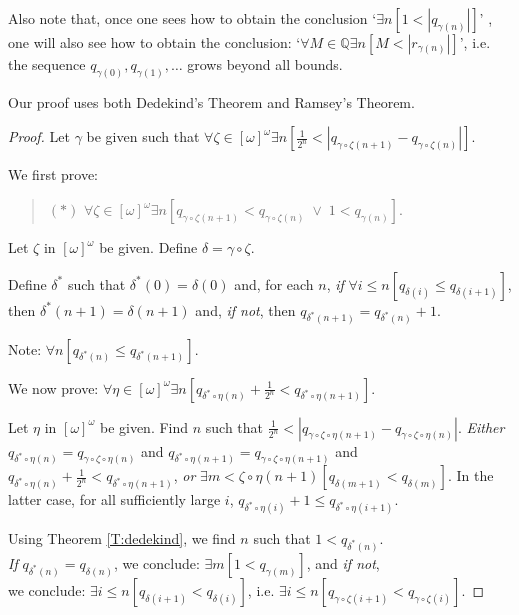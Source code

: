 \documentclass[a4paper]{amsart}
\theoremstyle{plain}
\begin{document}
	Also note that, once one sees how to obtain the conclusion `$\exists n[ 1 <|q_{ \gamma(n)}|]$' , one will also see how to obtain the conclusion:  `$\forall M\in \mathbb{Q}\exists n[ M<|r_{\gamma(n)}|]$', i.e. the sequence $q_{\gamma(0)}, q_{\gamma(1)}, \ldots$  grows beyond all bounds.
	
	Our proof uses both Dedekind's Theorem and Ramsey's Theorem. 
	\begin{proof}Let $\gamma$ be given such that $\forall \zeta \in [\omega]^\omega\exists n [ \frac{1}{2^n}<|q_{\gamma\circ\zeta(n+1)} -q_{\gamma\circ\zeta(n)}|]$.
	
	
	\smallskip
	
	
	We first prove:\begin{quote} $(\ast)$ $\forall \zeta \in [\omega]^\omega\exists n[q_{\gamma\circ\zeta(n+1)}< q_{\gamma\circ\zeta(n)} \;\vee \;  1<q_{\gamma(n)}]$. \end{quote}
	
	Let $\zeta$ in $[\omega]^\omega$ be given.  Define $\delta=\gamma\circ\zeta$.
	
	Define $\delta^\ast$ such that $\delta^\ast(0)=\delta(0)$ and, for each $n$, {\it if} $\forall i \le n[q_{\delta(i)}\le q_{ \delta(i+1)}]$, then $\delta^\ast(n+1)=\delta(n+1)$ and, {\it if not}, then $q_{\delta^\ast(n+1)}= q_{\delta^\ast(n)}+1$.
	
	Note: $\forall n[q_{\delta^\ast(n)}\le q_{\delta^\ast(n+1)}]$.
	
	We now prove: $\forall \eta \in [\omega]^\omega \exists n[q_{\delta^\ast\circ\eta(n)}+\frac{1}{2^n} < q_{\delta^\ast\circ \eta(n+1)}]$. 
	
	Let $\eta$ in $[\omega]^\omega$ be given. Find $n$ such that $\frac{1}{2^n}<|q_{\gamma\circ\zeta\circ\eta(n+1)}-q_{\gamma\circ \zeta \circ \eta(n)}|$. {\it Either} $q_{\delta^\ast\circ \eta(n)}=q_{\gamma\circ\zeta\circ\eta(n)}$ and $q_{\delta^\ast\circ \eta(n+1)}=q_{\gamma\circ\zeta\circ\eta(n+1)}$ and $q_{\delta^\ast\circ\eta(n)}+\frac{1}{2^n} < q_{\delta^\ast\circ \eta(n+1)}$, {\it or} $\exists m<\zeta\circ\eta(n+1)[q_{\delta(m+1)}< q_{\delta(m)}]$. In the latter case, for all sufficiently large $i$, $q_{\delta^\ast\circ \eta(i)} + 1\le q_{\delta^\ast\circ\eta(i+1)}$. 
	
	\smallskip Using Theorem \ref{T:dedekind}, we find $n$ such that $1<q_{\delta^\ast(n)}$. \\{\it If} $q_{\delta^\ast(n)} = q_{\delta(n)}$, we conclude: $\exists m[1<q_{\gamma(m)}]$, and {\it if not}, \\we conclude: $\exists i\le n[q_{\delta(i+1)}<q_{\delta(i)}]$, i.e.  $\exists i\le n[q_{\gamma\circ\zeta(i+1)}<q_{\gamma\circ\zeta(i)}]$.
	

\end{proof}
\end{document}
